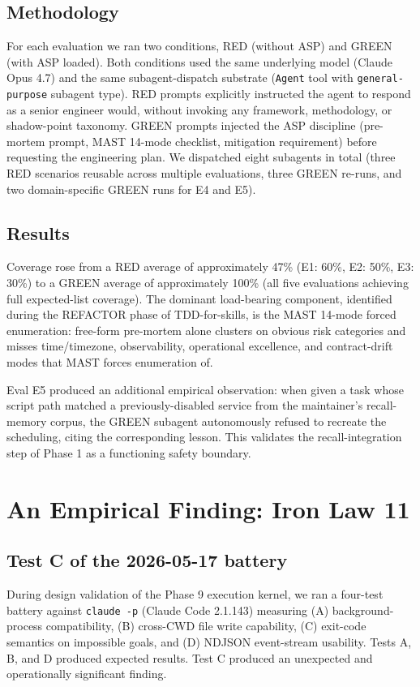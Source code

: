 \documentclass[11pt, a4paper]{article}
\begin{document}
\subsection{Methodology}
For each evaluation we ran two conditions, RED (without ASP) and GREEN (with ASP loaded). Both conditions used the same underlying model (Claude Opus 4.7) and the same subagent-dispatch substrate (\texttt{Agent} tool with \texttt{general-purpose} subagent type). RED prompts explicitly instructed the agent to respond as a senior engineer would, without invoking any framework, methodology, or shadow-point taxonomy. GREEN prompts injected the ASP discipline (pre-mortem prompt, MAST 14-mode checklist, mitigation requirement) before requesting the engineering plan. We dispatched eight subagents in total (three RED scenarios reusable across multiple evaluations, three GREEN re-runs, and two domain-specific GREEN runs for E4 and E5).

\subsection{Results}
Coverage rose from a RED average of approximately 47\% (E1: 60\%, E2: 50\%, E3: 30\%) to a GREEN average of approximately 100\% (all five evaluations achieving full expected-list coverage). The dominant load-bearing component, identified during the REFACTOR phase of TDD-for-skills, is the MAST 14-mode forced enumeration: free-form pre-mortem alone clusters on obvious risk categories and misses time/timezone, observability, operational excellence, and contract-drift modes that MAST forces enumeration of.

Eval E5 produced an additional empirical observation: when given a task whose script path matched a previously-disabled service from the maintainer's recall-memory corpus, the GREEN subagent autonomously refused to recreate the scheduling, citing the corresponding lesson. This validates the recall-integration step of Phase 1 as a functioning safety boundary.

\section{An Empirical Finding: Iron Law 11}
\label{sec:ironlaw11}

\subsection{Test C of the 2026-05-17 battery}
During design validation of the Phase 9 execution kernel, we ran a four-test battery against \texttt{claude -p} (Claude Code 2.1.143) measuring (A) background-process compatibility, (B) cross-CWD file write capability, (C) exit-code semantics on impossible goals, and (D) NDJSON event-stream usability. Tests A, B, and D produced expected results. Test C produced an unexpected and operationally significant finding.
\end{document}
